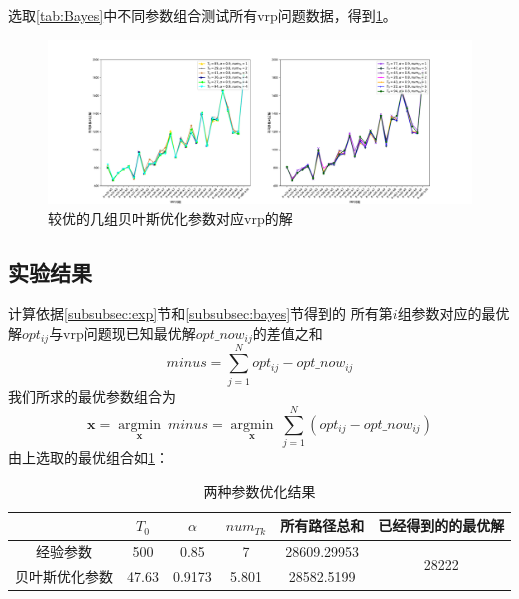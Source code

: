 \documentclass{nudt}
\begin{document}
  选取\cref{tab:Bayes}中不同参数组合测试所有vrp问题数据，得到\cref{fig:bayes_opt}。
\begin{figure}[H]
	\centering
	\includegraphics[width=\textwidth]{image/Bayes opt.pdf}
	\caption{较优的几组贝叶斯优化参数对应vrp的解}
	\label{fig:bayes_opt}
\end{figure}
\subsection{实验结果}
计算依据\ref{subsubsec:exp}节和\ref{subsubsec:bayes}节得到的
所有第$i$组参数对应的最优解$opt_{ij}$与vrp问题现已知最优解$opt\_now_{ij}$的差值之和
\[
	minus = \sum\limits_{j = 1}^{N}	opt_{ij}-opt\_now_{ij}
\]
我们所求的最优参数组合为
\[
	\mathbf{x} = \mathop{\arg\min}\limits_{\mathbf{x}}\ minus=\mathop{\arg\min}\limits_{\mathbf{x}}\ \sum\limits_{j = 1}^{N}(opt_{ij}-opt\_now_{ij})
\]
由上选取的最优组合如\cref{tab:exp and bayes index}：
\begin{table}[htbp]
	\centering
	\caption{两种参数优化结果}
	  \begin{tabular}{cccccc}
	  \toprule
		  & $ T_0$ & $\alpha $ & $num_{Tk}$ & 所有路径总和 & 已经得到的的最优解 \\
	  \midrule
	  经验参数 & 500 & 0.85 & 7   & 28609.29953 & \multirow{2}[2]{*}{28222} \\
	  贝叶斯优化参数 & 47.63 & 0.9173 & 5.801 & 28582.5199 &  \\
	  \bottomrule
	  \end{tabular}%
	\label{tab:exp and bayes index}%
  \end{table}%
\end{document}
